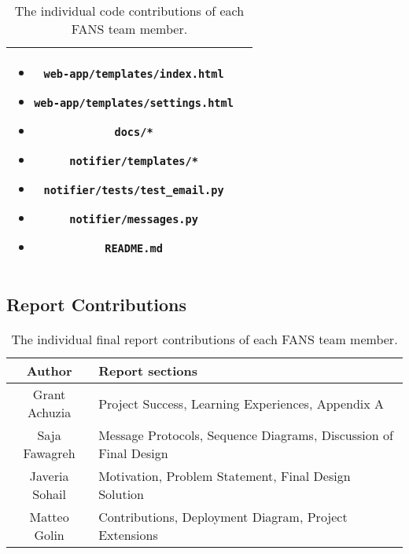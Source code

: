 \begin{table}[H]
\begin{tabular}{| c | p{5in} |}
{\begin{itemize}[noitemsep]
                    \item \texttt{web-app/templates/index.html}
                    \item \texttt{web-app/templates/settings.html}
                    \item \texttt{docs/*}
                    \item \texttt{notifier/templates/*}
                    \item \texttt{notifier/tests/test\_email.py}
                    \item \texttt{notifier/messages.py}
                    \item \texttt{README.md}
                \end{itemize}
        }                           \\
        \hline
    \end{tabular}
    \caption{The individual code contributions of each FANS team member.}
\end{table}

\subsection{Report Contributions}

\begin{table}[H]
    \centering
    \begin{tabular}{| c | p{5in} |}
        \hline
        Author         & Report sections                                                  \\
        \hline
        Grant Achuzia  & Project Success, Learning Experiences, Appendix A                \\
        \hline
        Saja Fawagreh  & Message Protocols, Sequence Diagrams, Discussion of Final Design \\
        \hline
        Javeria Sohail & Motivation, Problem Statement, Final Design Solution             \\
        \hline
        Matteo Golin   & Contributions, Deployment Diagram, Project Extensions            \\
        \hline
    \end{tabular}
    \caption{The individual final report contributions of each FANS team member.}
\end{table}
